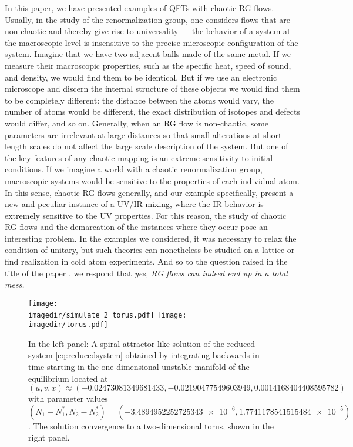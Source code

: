 In this paper, we have presented examples of QFTs with chaotic RG flows. Usually, in the study of the renormalization group, one considers flows that are non-chaotic and thereby give rise to universality --- the behavior of a system at the macroscopic level is insensitive to the precise microscopic configuration of the system. Imagine that we have two adjacent balls made of the same metal. If we measure their macroscopic properties, such as the specific heat, speed of sound, and density, we would find them to be identical. But if we use an electronic microscope and discern the internal structure of these objects we would find them to be completely different: the distance between the atoms would vary, the number of atoms would be different, the exact distribution of isotopes and defects would differ, and so on. Generally, when an RG flow is non-chaotic, some parameters are irrelevant at large distances so that small alterations at short length scales do not affect the large scale description of the system. But one of the key features of any chaotic mapping is an extreme sensitivity to initial conditions. If we imagine a world with a chaotic renormalization group, macroscopic systems would be sensitive to the properties of each individual atom. In this sense, chaotic RG flows generally, and our example specifically, present a new and peculiar instance of a UV/IR mixing, where the IR behavior is extremely sensitive to the UV properties. For this reason, the study of chaotic RG flows and the demarcation of the instances where they occur pose an interesting problem. In the examples we considered, it was necessary to relax the condition of unitary, but such theories can nonetheless be studied on a lattice or find realization in cold atom experiments. And so to the question raised in the title of the paper \cite{morozov2003can}, we respond that {\it yes, RG flows can indeed end up in a total mess.} 

\begin{figure}
    \texttt{[image: \\imagedir/simulate\_2\_torus.pdf]}%
    \hfill
    \texttt{[image: \\imagedir/torus.pdf]}
\caption{In the left panel: A spiral attractor-like solution of the reduced system \cref{eq:reducedsystem} obtained by integrating backwards in time starting in the one-dimensional unstable manifold of the equilibrium located at $(u,v,x)\approx (\num{-0.02473081349681433},\num{-0.02190477549603949},\num{0.0014168404408595782})$ with parameter values $(N_1-N_1^*, N_2-N_2^*) = (\num{-3.4894952252725343e-6}, \num{1.7741178541515484e-5})$.
The solution convergence to a two-dimensional torus, shown in the right panel.
\label{fig:2intersol}}
\end{figure}


